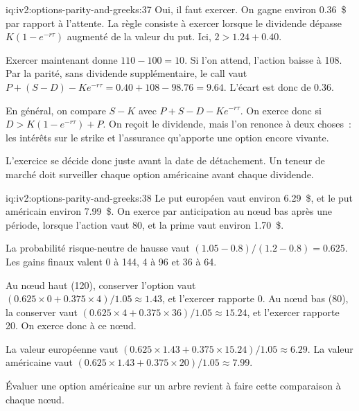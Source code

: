 \begin{solution}{iq:iv2:options-parity-and-greeks:37}
Oui, il faut exercer. On gagne environ 0.36~\$ par rapport à l'attente. La règle consiste à exercer lorsque le dividende dépasse $K(1 - e^{-r\tau})$ augmenté de la valeur du put. Ici, $2 > 1.24 + 0.40$.

Exercer maintenant donne $110 - 100 = 10$. Si l'on attend, l'action baisse à 108. Par la parité, sans dividende supplémentaire, le call vaut $P + (S - D) - Ke^{-r\tau} = 0.40 + 108 - 98.76 = 9.64$. L'écart est donc de 0.36.

En général, on compare $S - K$ avec $P + S - D - Ke^{-r\tau}$. On exerce donc si $D > K(1 - e^{-r\tau}) + P$. On reçoit le dividende, mais l'on renonce à deux choses~: les intérêts sur le strike et l'assurance qu'apporte une option encore vivante.

L'exercice se décide donc juste avant la date de détachement. Un teneur de marché doit surveiller chaque option américaine avant chaque dividende.

\end{solution}

\begin{solution}{iq:iv2:options-parity-and-greeks:38}
Le put européen vaut environ 6.29~\$, et le put américain environ 7.99~\$. On exerce par anticipation au nœud bas après une période, lorsque l'action vaut 80, et la prime vaut environ 1.70~\$.

La probabilité risque-neutre de hausse vaut $(1.05 - 0.8)/(1.2 - 0.8) = 0.625$. Les gains finaux valent 0 à 144, 4 à 96 et 36 à 64.

Au nœud haut (120), conserver l'option vaut $(0.625 \times 0 + 0.375 \times 4)/1.05 \approx 1.43$, et l'exercer rapporte 0. Au nœud bas (80), la conserver vaut $(0.625 \times 4 + 0.375 \times 36)/1.05 \approx 15.24$, et l'exercer rapporte 20. On exerce donc à ce nœud.

La valeur européenne vaut $(0.625 \times 1.43 + 0.375 \times 15.24)/1.05 \approx 6.29$. La valeur américaine vaut $(0.625 \times 1.43 + 0.375 \times 20)/1.05 \approx 7.99$.

Évaluer une option américaine sur un arbre revient à faire cette comparaison à chaque nœud.

\end{solution}

